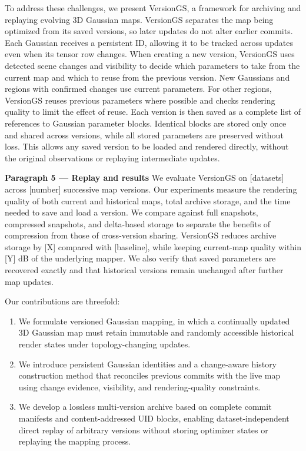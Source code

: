 To address these challenges, we present VersionGS, a framework for
archiving and replaying evolving 3D Gaussian maps.
VersionGS separates the map being optimized from its saved versions,
so later updates do not alter earlier commits.
Each Gaussian receives a persistent ID, allowing it to be tracked
across updates even when its tensor row changes.
When creating a new version, VersionGS uses detected scene changes
and visibility to decide which parameters to take from the current
map and which to reuse from the previous version.
New Gaussians and regions with confirmed changes use current parameters.
For other regions, VersionGS reuses previous parameters where possible
and checks rendering quality to limit the effect of reuse.
Each version is then saved as a complete list of references to
Gaussian parameter blocks.
Identical blocks are stored only once and shared across versions,
while all stored parameters are preserved without loss.
This allows any saved version to be loaded and rendered directly,
without the original observations or replaying intermediate updates.


\textbf{Paragraph 5 — Replay and results}
We evaluate VersionGS on [datasets] across [number] successive map
versions.
Our experiments measure the rendering quality of both current and
historical maps, total archive storage, and the time needed to save
and load a version.
We compare against full snapshots, compressed snapshots, and
delta-based storage to separate the benefits of compression
from those of cross-version sharing.
VersionGS reduces archive storage by [X] compared with [baseline],
while keeping current-map quality within [Y] dB of the underlying mapper.
We also verify that saved parameters are recovered exactly and that
historical versions remain unchanged after further map updates.


 Our contributions are threefold:
\begin{enumerate}
  \item We formulate versioned Gaussian mapping, in which a continually updated 3D Gaussian map must retain immutable and randomly accessible historical render states under topology-changing updates.
  \item We introduce persistent Gaussian identities and a change-aware history construction method that reconciles previous commits with the live map using change evidence, visibility, and rendering-quality constraints.
  \item We develop a lossless multi-version archive based on complete commit manifests and content-addressed UID blocks, enabling dataset-independent direct replay of arbitrary versions without storing optimizer states or replaying the mapping process.
\end{enumerate}